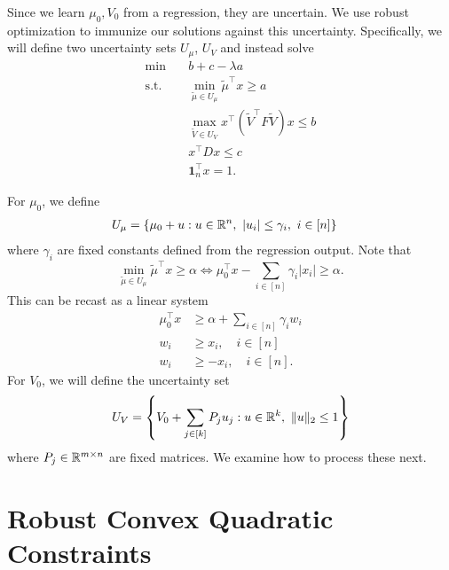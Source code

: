 \documentclass[11pt,oneside]{article}
\theoremstyle{plain}
\theoremstyle{definition}
\theoremstyle{remark}
\begin{document}
Since we learn $\mu_0, V_0$ from a regression, they are uncertain. We use robust optimization to immunize our solutions against this uncertainty. Specifically, we will define two uncertainty sets $U_\mu$, $U_V$ and instead solve
\begin{align*}
\min &\quad b + c - \lambda a\\
\text{s.t.} &\quad \min_{\tilde{\mu} \in U_\mu} \tilde{\mu}^\top x \geq a\\
&\quad \max_{\tilde{V} \in U_V} x^\top (\tilde{V}^\top F \tilde{V}) x \leq b\\
&\quad x^\top D x \leq c\\
&\quad \bm{1}_n^\top x = 1.
\end{align*}

For $\mu_0$, we define
\begin{align*}
U_\mu &= \{ \mu_0 + u : u \in \mathbb{R}^n,\ |u_i| \leq \gamma_i, \ i \in [n] \}
\end{align*}
where $\gamma_i$ are fixed constants defined from the regression output. Note that
\[ \min_{\tilde{\mu} \in U_\mu} \tilde{\mu}^\top x \geq \alpha \iff \mu_0^\top x - \sum_{i \in [n]} \gamma_i |x_i| \geq \alpha. \]
This can be recast as a linear system
\begin{align*}
\mu_0^\top x  &\geq \alpha + \sum_{i \in [n]} \gamma_i w_i\\
w_i &\geq x_i, \quad i \in [n]\\
w_i &\geq -x_i, \quad i \in [n].
\end{align*}
For $V_0$, we will define the uncertainty set
\[ U_V = \left\{ V_0 + \sum_{j \in [k]} P_j u_j : u \in \mathbb{R}^k,\ \|u\|_2 \leq 1 \right\} \]
where $P_j \in \mathbb{R}^{m \times n}$ are fixed matrices. We examine how to process these next.


\section{Robust Convex Quadratic Constraints}
\end{document}
